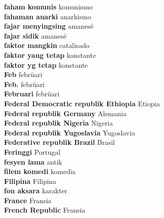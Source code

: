 \textbf{ faham komunis  } komunismo \\
\textbf{ fahaman anarki  } anarkismo \\
\textbf{ fajar menyingsing  } amanesé \\
\textbf{ fajar sidik  } amanesé \\
\textbf{ faktor mangkin  } catalisado \\
\textbf{ faktor yang tetap  } konstante \\
\textbf{ faktor yg tetap  } konstante \\
\textbf{ Feb  } febrüari \\
\textbf{ Feb.  } febrüari \\
\textbf{ Februari  } febrüari \\
\textbf{ Federal Democratic republik Ethiopia  } Etiopia \\
\textbf{ Federal republik Germany  } Alemania \\
\textbf{ Federal republik Nigeria  } Nigeria \\
\textbf{ Federal republik Yugoslavia  } Yugoslavia \\
\textbf{ Federative republik Brazil  } Brasil \\
\textbf{ Feringgi  } Portugal \\
\textbf{ fesyen lama  } antik \\
\textbf{ filem komedi  } komedia \\
\textbf{ Filipina  } Filipina \\
\textbf{ fon aksara  } karakter \\
\textbf{ France  } Fransia \\
\textbf{ French Republic  } Fransia \\
